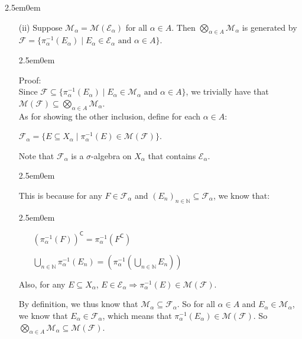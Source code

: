 \documentclass{book}
\newcommand{\hThree}{%
   \color{PineGreen!85!Orange}
   \fontsize{12}{14}\selectfont%
}
\newcommand{\hFour}{%
   \color{Cyan}
   \fontsize{12}{14}\selectfont%
}
\newenvironment{myIndent}{%
   \begin{adjustwidth}{2.5em}{0em}%
}{%
   \end{adjustwidth}%
}
\newcommand{\comp}{\mathsf{C}}
\newcommand{\retTwo}{\hfill\bigbreak}
\begin{document}
\begin{myIndent}
\begin{itemize}
      \item[(ii)] Suppose $\mathcal{M}_\alpha = \mathcal{M}(\mathcal{E}_\alpha)$ for all $\alpha \in A$. Then $\bigotimes\limits_{\alpha \in A}\mathcal{M}_\alpha$ is generated by\\ [-8pt] $\mathcal{F} = \{\pi^{-1}_\alpha(E_\alpha) \mid E_\alpha \in \mathcal{E}_\alpha \text{ and } \alpha \in A\}$.
      
      \begin{myIndent}\hThree
         Proof:\\
         Since $\mathcal{F} \subseteq \{\pi_\alpha^{-1}(E_\alpha) \mid E_\alpha \in \mathcal{M}_\alpha \text{ and } \alpha \in A\}$, we trivially have that\\ $\mathcal{M}(\mathcal{F}) \subseteq \bigotimes\limits_{\alpha \in A} \mathcal{M}_\alpha$.\\ [-2pt]

         As for showing the other inclusion, define for each $\alpha \in A$:

         {\centering$\mathcal{F}_\alpha = \{E \subseteq X_\alpha \mid \pi_\alpha^{-1}(E) \in \mathcal{M}(\mathcal{F})\}$.\retTwo\par}

         Note that $\mathcal{F}_\alpha$ is a $\sigma$-algebra on $X_\alpha$ that contains $\mathcal{E}_\alpha$.
         \begin{myIndent}\hFour
            This is because for any $F \in \mathcal{F}_\alpha$ and $(E_n)_{n \in \mathbb{N}} \subseteq \mathcal{F}_\alpha$, we know that:
            \begin{myIndent}
               \begin{itemize}
                  \item[\bullet] $\left(\pi_{\alpha}^{-1}(F)\right)^\comp = \pi_{\alpha}^{-1}(F^\comp)$
                  \item[\bullet] $\bigcup\limits_{n \in \mathbb{N}}\pi_{\alpha}^{-1}(E_n) = \left(\pi_{\alpha}^{-1}(\bigcup\limits_{n \in \mathbb{N}}E_n)\right)$\retTwo
               \end{itemize}
            \end{myIndent}

            Also, for any $E \subseteq X_\alpha$, $E \in \mathcal{E}_\alpha \Longrightarrow \pi_\alpha^{-1}(E) \in \mathcal{M}(\mathcal{F})$.\retTwo
         \end{myIndent}

         By definition, we thus know that $\mathcal{M}_\alpha \subseteq \mathcal{F}_\alpha$. So for all $\alpha \in A$ and $E_\alpha \in \mathcal{M}_\alpha$, we know that $E_\alpha \in \mathcal{F}_\alpha$, which means that $\pi_\alpha^{-1}(E_\alpha) \in \mathcal{M}(\mathcal{F})$. So\\ $\bigotimes\limits_{\alpha \in A} \mathcal{M}_\alpha \subseteq \mathcal{M}(\mathcal{F})$.\retTwo
      \end{myIndent}


\end{itemize}
\end{myIndent}
\end{document}
